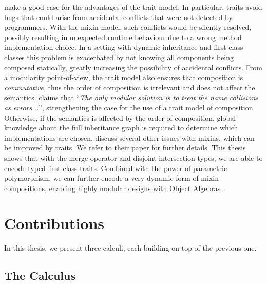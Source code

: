 \citet{scharli2003traits} make a good case for the advantages of the trait
model. In particular, traits avoid bugs that could arise from accidental
conflicts that were not detected by programmers. With the mixin model, such
conflicts would be silently resolved, possibly resulting in unexpected runtime
behaviour due to a wrong method implementation choice. In a setting with dynamic
inheritance and first-class classes this problem is exacerbated by not knowing
all components being composed statically, greatly increasing the possibility of
accidental conflicts. From a modularity point-of-view, the trait model also
ensures that composition is \emph{commutative}, thus the order of composition is
irrelevant and does not affect the semantics. \citet{bracha1992programming}
claims that ``\emph{The only modular solution is to treat the name collisions as
  errors...}'', strengthening the case for the use of a trait model of
composition. Otherwise, if the semantics is affected by the order of
composition, global knowledge about the full inheritance graph is required to
determine which implementations are chosen. \citet{scharli2003traits} discuss
several other issues with mixins, which can be improved by traits. We refer to
their paper for further details. This thesis shows that with the merge operator
and disjoint intersection types, we are able to encode typed first-class traits.
Combined with the power of parametric polymorphism, we can further encode a very
dynamic form of mixin compositions, enabling highly modular designs with Object
Algebras~\citep{oliveira2012extensibility}.


\section{Contributions}

In this thesis, we present three calculi, each building on top of the previous one.

\subsection{The \namee Calculus}

